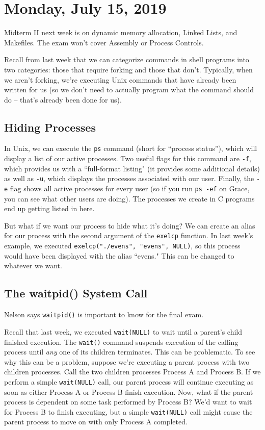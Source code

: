 \section{Monday, July 15, 2019}
Midterm II next week is on dynamic memory allocation, Linked Lists, and Makefiles. The exam won't cover Assembly or Process Controls.


Recall from last week that we can categorize commands in shell programs into two categories: those that require forking and those that don't. Typically, when we aren't forking, we're executing Unix commands that have already been written for us (so we don't need to actually program what the command should do -- that's already been done for us).

\subsection{Hiding Processes}
In Unix, we can execute the \verb!ps! command (short for ``process status''), which will display a list of our active processes. Two useful flags for this command are \verb!-f!, which provides us with a ``full-format listing" (it provides some additional details) as well as \verb!-u!, which displays the processes associated with our user. Finally, the \verb!-e! flag shows all active processes for every user (so if you run \verb!ps -ef! on Grace, you can see what other users are doing).  The processes we create in C programs end up getting listed in here. 

But what if we want our process to hide what it's doing? We can create an alias for our process with the second argument of the \verb!exelcp! function. In last week's example, we executed \verb!exelcp("./evens", "evens", NULL)!, so this process would have been displayed with the alias ``evens." This can be changed to whatever we want.

\subsection{The waitpid() System Call}
Nelson says \verb!waitpid()! is important to know for the final exam.

Recall that last week, we executed \verb!wait(NULL)! to wait until a parent's child finished execution. The \verb!wait()! command suspends execution of the calling process until \textit{any} one of its children terminates. This can be problematic. To see why this can be a problem, suppose we're executing a parent process with two children processes. Call the two children processes Process A and Process B. If we perform a simple \verb!wait(NULL)! call, our parent process will continue executing as soon as either Process A or Process B finish execution. Now, what if the parent process is dependent on some task performed by Process B? We'd want to wait for Process B to finish executing, but a simple \verb!wait(NULL)!  call might cause the parent process to move on with only Process A completed.


